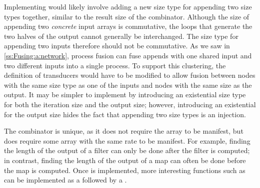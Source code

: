 Implementing \Hs@append@ would likely involve adding a new size type for appending two size types together, similar to the result size of the \Hs@cross@ combinator.
Although the size of appending two \emph{concrete} input arrays is commutative, the loops that generate the two halves of the output cannot generally be interchanged.
The size type for appending two inputs therefore should not be commutative.
As we saw in \cref{ss:Fusing:a:network}, process fusion can fuse appends with one shared input and two different inputs into a single process.
To support this clustering, the definition of transducers would have to be modified to allow fusion between nodes with the same size type as one of the inputs and nodes with the same size as the output.
It may be simpler to implement \Hs@append@ by introducing an existential size type for both the iteration size and the output size; however, introducing an existential for the output size hides the fact that appending two size types is an injection.

The \Hs@length@ combinator is unique, as it does not require the array to be manifest, but does require some array with the same rate to be manifest.
For example, finding the length of the output of a filter can only be done after the filter is computed; in contrast, finding the length of the output of a map can often be done before the map is computed.
Once \Hs@length@ is implemented, more interesting functions such as \Hs@reverse@ can be implemented as a \Hs@generate@ followed by a \Hs@gather@.

% 
 
